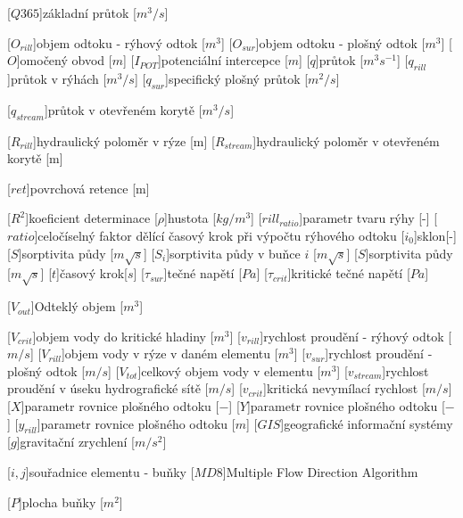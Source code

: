 \begin{acronym}
[$Q365$]{základní průtok [$m^3/s$]}

[$O_{rill}$]{objem odtoku - rýhový odtok [$m^{3}$]}
[$O_{sur}$]{objem odtoku - plošný odtok [$m^{3}$]}
[$O$]{omočený obvod [$m$]}
[$I_{POT}$]{potenciální intercepce [$m$]}
[$q$]{průtok [$m^{3}{s}^{-1}$]}
[$q_{rill}$]{průtok v rýhách [$m^{3}/s$]}
[$q_{sur}$]{specifický plošný průtok [$m^{2}/s$]}

[$q_{stream}$]{průtok v otevřeném korytě [$m^{3}/s$]}

[$R_{rill}$]{hydraulický poloměr v rýze [m]}
[$R_{stream}$]{hydraulický poloměr v otevřeném korytě [m]}

[$ret$]{povrchová retence [m]}

[$R^2$]{koeficient determinace}
[$\rho$]{hustota [$kg/m^{3}$]}
[$rill_{ratio}$]{parametr tvaru rýhy [-]}
[$ratio$]{celočíselný faktor dělící časový krok při výpočtu rýhového odtoku}
[$i_{0}$]{sklon[-]}
[$S$]{sorptivita půdy [$m \sqrt{s}$]}
[$S_{i}$]{sorptivita půdy  v buňce $i$  [$m \sqrt{s}$]}
[$S$]{sorptivita půdy [$m \sqrt{s}$]}
[$t$]{časový krok[$s$]}
[$\tau_{sur}$]{tečné napětí [$Pa$]}
[$\tau_{crit}$]{kritické tečné napětí [$Pa$]}

[$V_{out}$]{Odteklý objem [$m^{3}$]}

[$V_{crit}$]{objem vody do kritické hladiny [$m^{3}$]}
[$v_{rill}$]{rychlost proudění - rýhový odtok [$m/s$]}
[$V_{rill}$]{objem vody v rýze v daném elementu [$m^{3}$]}
[$v_{sur}$]{rychlost proudění - plošný odtok [$m/s$]}
[$V_{tot}$]{celkový objem vody v elementu [$m^{3}$]}
[$v_{stream}$]{rychlost proudění v úseku hydrografické sítě [$m/s$]}
[$v_{crit}$]{kritická nevymílací rychlost [$m/s$]}
[$X$]{parametr rovnice plošného odtoku [$-$]}
[$Y$]{parametr rovnice plošného odtoku [$-$]}
[$y_{rill}$]{parametr rovnice plošného odtoku [$m$]}
[$GIS$]{geografické informační systémy}
[$g$]{gravitační zrychlení [$m/s^{2}$]}

[$i, j$]{souřadnice elementu - buňky}
[$MD8$]{Multiple Flow Direction Algorithm}

[$P$]{plocha buňky [$m^2$]}



\end{acronym}
